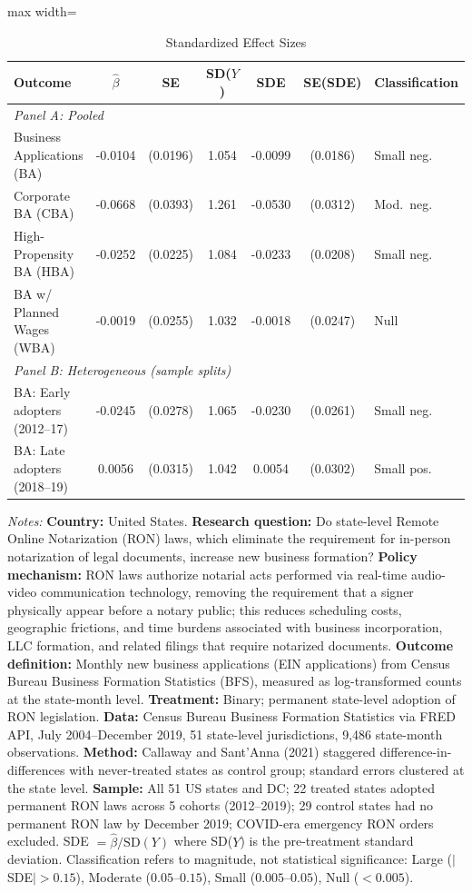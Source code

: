 \begin{table}[t]
\centering
\caption{Standardized Effect Sizes}
\label{tab:sde}
\footnotesize
\begin{adjustbox}{max width=\textwidth}
\begin{tabular}{l cc c cc l}
\hline\hline
Outcome & $\hat{\beta}$ & SE & SD($Y$) & SDE & SE(SDE) & Classification \\
\hline
\multicolumn{7}{l}{\textit{Panel A: Pooled}} \\
Business Applications (BA) & -0.0104 & (0.0196) & 1.054 & -0.0099 & (0.0186) & Small neg. \\
Corporate BA (CBA) & -0.0668 & (0.0393) & 1.261 & -0.0530 & (0.0312) & Mod.\ neg. \\
High-Propensity BA (HBA) & -0.0252 & (0.0225) & 1.084 & -0.0233 & (0.0208) & Small neg. \\
BA w/ Planned Wages (WBA) & -0.0019 & (0.0255) & 1.032 & -0.0018 & (0.0247) & Null \\
\hline
\multicolumn{7}{l}{\textit{Panel B: Heterogeneous (sample splits)}} \\
BA: Early adopters (2012--17) & -0.0245 & (0.0278) & 1.065 & -0.0230 & (0.0261) & Small neg. \\
BA: Late adopters (2018--19) & 0.0056 & (0.0315) & 1.042 & 0.0054 & (0.0302) & Small pos. \\
\hline\hline
\end{tabular}
\end{adjustbox}
\par\vspace{0.3em}
\parbox{\textwidth}{\scriptsize \textit{Notes:} \textbf{Country:} United States. \textbf{Research question:} Do state-level Remote Online Notarization (RON) laws, which eliminate the requirement for in-person notarization of legal documents, increase new business formation? \textbf{Policy mechanism:} RON laws authorize notarial acts performed via real-time audio-video communication technology, removing the requirement that a signer physically appear before a notary public; this reduces scheduling costs, geographic frictions, and time burdens associated with business incorporation, LLC formation, and related filings that require notarized documents. \textbf{Outcome definition:} Monthly new business applications (EIN applications) from Census Bureau Business Formation Statistics (BFS), measured as log-transformed counts at the state-month level. \textbf{Treatment:} Binary; permanent state-level adoption of RON legislation. \textbf{Data:} Census Bureau Business Formation Statistics via FRED API, July 2004--December 2019, 51 state-level jurisdictions, 9,486 state-month observations. \textbf{Method:} Callaway and Sant'Anna (2021) staggered difference-in-differences with never-treated states as control group; standard errors clustered at the state level. \textbf{Sample:} All 51 US states and DC; 22 treated states adopted permanent RON laws across 5 cohorts (2012--2019); 29 control states had no permanent RON law by December 2019; COVID-era emergency RON orders excluded. SDE $= \hat{\beta} / \text{SD}(Y)$ where SD($Y$) is the pre-treatment standard deviation. Classification refers to magnitude, not statistical significance: Large ($|$SDE$| > 0.15$), Moderate ($0.05$--$0.15$), Small ($0.005$--$0.05$), Null ($< 0.005$).}
\end{table}
